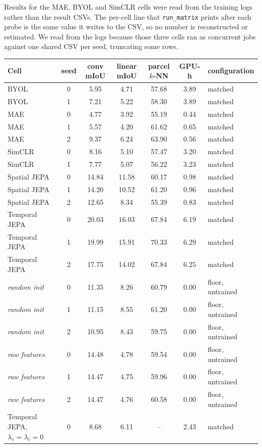 \documentclass{article}
\begin{document}
Results for the MAE, BYOL and SimCLR cells were read from the training logs rather than the result
CSVs. The per-cell line that \texttt{run\_matrix} prints after each probe is the same value it writes
to the CSV, so no number is reconstructed or estimated. We read from the logs because those three
cells ran as concurrent jobs against one shared CSV per seed, truncating some rows.

\begin{table}[h]
  \centering
  \small
  \setlength{\tabcolsep}{4pt}
  \begin{tabular}{lcccccl}
    \toprule
    Cell & seed & conv mIoU & linear mIoU & parcel $k$-NN & GPU-h & configuration \\
    \midrule
    BYOL & 0 & 5.95 & 4.71 & 57.68 & 3.89 & matched \\
    BYOL & 1 & 7.21 & 5.22 & 58.30 & 3.89 & matched \\
    MAE & 0 & 4.77 & 3.92 & 55.19 & 0.44 & matched \\
    MAE & 1 & 5.57 & 4.20 & 61.62 & 0.65 & matched \\
    MAE & 2 & 9.37 & 6.24 & 63.90 & 0.56 & matched \\
    SimCLR & 0 & 8.16 & 5.10 & 57.47 & 3.20 & matched \\
    SimCLR & 1 & 7.77 & 5.07 & 56.22 & 3.23 & matched \\
    Spatial JEPA & 0 & 14.84 & 11.58 & 60.17 & 0.98 & matched \\
    Spatial JEPA & 1 & 14.20 & 10.52 & 61.20 & 0.96 & matched \\
    Spatial JEPA & 2 & 12.65 & 8.34 & 55.39 & 0.83 & matched \\
    Temporal JEPA & 0 & 20.03 & 16.03 & 67.84 & 6.19 & matched \\
    Temporal JEPA & 1 & 19.99 & 15.91 & 70.33 & 6.29 & matched \\
    Temporal JEPA & 2 & 17.75 & 14.02 & 67.84 & 6.25 & matched \\
    \midrule
    \emph{random init} & 0 & 11.35 & 8.26 & 60.79 & 0.00 & floor, untrained \\
    \emph{random init} & 1 & 11.15 & 8.55 & 61.20 & 0.00 & floor, untrained \\
    \emph{random init} & 2 & 10.95 & 8.43 & 59.75 & 0.00 & floor, untrained \\
    \emph{raw features} & 0 & 14.48 & 4.78 & 59.54 & 0.00 & floor, untrained \\
    \emph{raw features} & 1 & 14.47 & 4.75 & 59.96 & 0.00 & floor, untrained \\
    \emph{raw features} & 2 & 14.47 & 4.76 & 60.58 & 0.00 & floor, untrained \\
    \midrule
    Temporal JEPA, $\lambda_v{=}\lambda_c{=}0$ & 0 & 8.68 & 6.11 & -- & 2.43 & matched \\
    \bottomrule
  \end{tabular}
\end{table}
\end{document}
